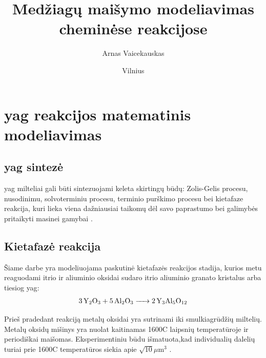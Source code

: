 \documentclass{VUMIFInfKursinis}
\institute{Informatikos institutas}  %
\title{Medžiagų maišymo modeliavimas cheminėse
reakcijose}
\author{Arnas Vaicekauskas}
\date{Vilnius \\ \the\year}
\begin{document}
\maketitle

\tableofcontents






\section{\acs{yag} reakcijos matematinis modeliavimas}

\subsection{\acs{yag} sintezė}

\acs{yag} milteliai gali būti sintezuojami keleta skirtingų būdų: Zolis-Gelis procesu, nusodinimu, solvoterminiu procesu, terminio purškimo procesu bei kietafaze reakcija, kuri lieka viena dažniausiai taikomų dėl savo paprastumo bei galimybės pritaikyti masinei gamybai \cite{zhangNovelSynthesisYAG2005}.

\subsection{Kietafazė reakcija}

Šiame darbe yra modeliuojama paskutinė kietafazės reakcijos stadija, kurios metu reaguodami itrio ir aliuminio oksidai sudaro itrio aliuminio granato kristalus arba tiesiog \acs{yag}:
\begin{align*}
  \ce{3Y_2O_3 + 5Al_2O_3 -> 2Y_3Al_5O_12}
\end{align*}

Prieš pradedant reakciją metalų oksidai yra sutrinami iki smulkiagrūdžių miltelių. Metalų oksidų mišinys yra nuolat kaitinamas 1600\degree C laipsnių temperatūroje ir periodiškai maišomas. Eksperimentiniu būdu išmatuota,kad individualių dalelių turiai prie 1600\degree C temperatūros siekia apie $\sqrt{10}\mu\text{m}^3$ \cite{ivanauskasComputationalModellingYAG2009}.
\end{document}

